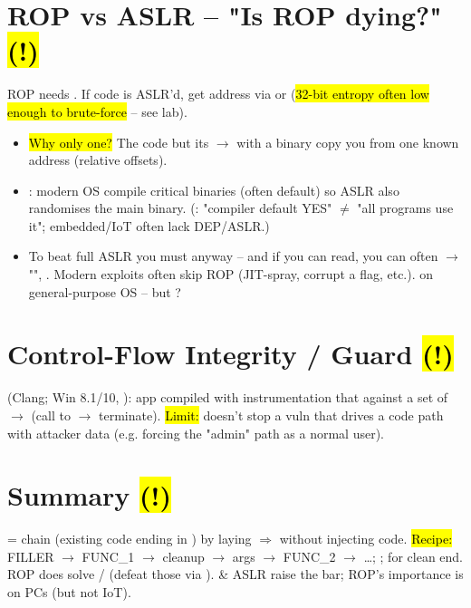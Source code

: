 \section{ROP vs ASLR -- "Is ROP dying?" \hl{(!)}}
ROP needs . If  code is ASLR'd, get  address via  or  (\hl{32-bit entropy often low enough to brute-force} -- see lab).
\begin{itemize}
\item \hl{Why only one?} The code  but its  $\to$ with a binary copy you  from one known address (relative offsets).
\item {}: modern OS compile critical binaries  (often default) so ASLR also randomises the main binary. (: "compiler default YES" $\ne$ "all programs use it"; embedded/IoT often lack DEP/ASLR.)
\item {} To beat full ASLR you must  anyway -- and if you can read, you can often  $\to$ "", . Modern exploits often skip ROP (JIT-spray, corrupt a  flag, etc.).  on general-purpose OS -- but ?
\end{itemize}

\section{Control-Flow Integrity / Guard \hl{(!)}}
 (Clang; Win 8.1/10, ): app compiled with instrumentation that  against a set of  $\to$  (call to  $\to$ terminate). \hl{Limit:} doesn't stop a vuln that drives a  code path with attacker data (e.g. forcing the "admin" path as a normal user).

\section{Summary \hl{(!)}}
\begin{defbox}
 = chain  (existing code ending in ) by laying  $\Rightarrow$  without injecting code. \hl{Recipe:} FILLER $\to$ FUNC\_1 $\to$  cleanup $\to$ args $\to$ FUNC\_2 $\to$ \dots ; ;  for clean end. ROP does  solve / (defeat those via ).  \& ASLR raise the bar; ROP's importance is  on PCs (but not IoT).
\end{defbox}


